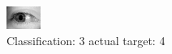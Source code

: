 \begin{figure}[h!]
\begin{center}
\includegraphics[width=0.60\columnwidth]{figures/ID3157_class_3_target_4.png}
\end{center}
\caption{ Classification: 3 actual target: 4}
\label{fig:ID3157_class_3_target_4}
\end{figure}
